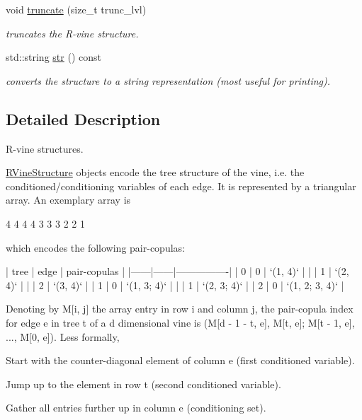\begin{DoxyCompactItemize}
void \hyperlink{classvinecopulib_1_1_r_vine_structure_a7580c0663ac702f718944de2a0fcd1d3}{truncate} (size\+\_\+t trunc\+\_\+lvl)
\begin{DoxyCompactList}\small\item\em truncates the R-\/vine structure. \end{DoxyCompactList}\item 
\mbox{\label{classvinecopulib_1_1_r_vine_structure_a488bcaf1868f79f733e812f80445199e}} 
std\+::string \hyperlink{classvinecopulib_1_1_r_vine_structure_a488bcaf1868f79f733e812f80445199e}{str} () const
\begin{DoxyCompactList}\small\item\em converts the structure to a string representation (most useful for printing). \end{DoxyCompactList}\end{DoxyCompactItemize}


\subsection{Detailed Description}
R-\/vine structures. 

\hyperlink{classvinecopulib_1_1_r_vine_structure}{R\+Vine\+Structure} objects encode the tree structure of the vine, i.\+e. the conditioned/conditioning variables of each edge. It is represented by a triangular array. An exemplary array is 
\begin{DoxyCode}
4 4 4 4
3 3 3
2 2
1
\end{DoxyCode}
 which encodes the following pair-\/copulas\+: 
\begin{DoxyCode}
| tree | edge | pair-copulas   |
|------|------|----------------|
| 0    | 0    | `(1, 4)`       |
|      | 1    | `(2, 4)`       |
|      | 2    | `(3, 4)`       |
| 1    | 0    | `(1, 3; 4)`    |
|      | 1    | `(2, 3; 4)`    |
| 2    | 0    | `(1, 2; 3, 4)` |
\end{DoxyCode}
 Denoting by {\ttfamily M\mbox{[}i, j\mbox{]}} the array entry in row {\ttfamily i} and column {\ttfamily j}, the pair-\/copula index for edge {\ttfamily e} in tree {\ttfamily t} of a {\ttfamily d} dimensional vine is {\ttfamily (M\mbox{[}d -\/ 1 -\/ t, e\mbox{]}, M\mbox{[}t, e\mbox{]}; M\mbox{[}t -\/ 1, e\mbox{]}, ..., M\mbox{[}0, e\mbox{]})}. Less formally,
\begin{DoxyEnumerate}
\item Start with the counter-\/diagonal element of column {\ttfamily e} (first conditioned variable).
\item Jump up to the element in row {\ttfamily t} (second conditioned variable).
\item Gather all entries further up in column {\ttfamily e} (conditioning set).
\end{DoxyEnumerate}

